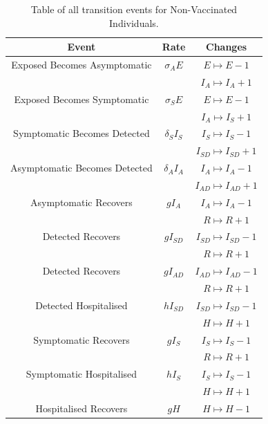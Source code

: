 \documentclass[a4paper,11pt]{article}
\theoremstyle{plain}
\theoremstyle{definition}
\begin{document}
\begin{table}[hbtp]
		\begin{center}
		    \caption{Table of all transition events for Non-Vaccinated Individuals.}
			\begin{tabular}{ c|c|c }
				Event & Rate & Changes \\ 
	        	\hline
		        \hline
	            Exposed Becomes Asymptomatic & $\sigma_AE$ & $E \mapsto E - 1$  \\
	            & & $I_A \mapsto I_A + 1$\\
	            \hline
	            Exposed Becomes Symptomatic & $\sigma_SE$ &  $E \mapsto E - 1$ \\
	            &  & $I_A \mapsto I_S + 1$\\
	            \hline
	            Symptomatic Becomes Detected & $\delta_SI_S$ & $I_S \mapsto I_S - 1$  \\
	            & & $I_{SD} \mapsto I_{SD} + 1$\\
	            \hline
	            Asymptomatic Becomes Detected & $\delta_A I_A$ & $I_A \mapsto I_A - 1$  \\
	            &  & $I_{AD} \mapsto I_{AD} + 1$\\
	            \hline
		        Asymptomatic Recovers & $g I_A$ & $I_A \mapsto I_A - 1$  \\
	            &  & $R \mapsto R + 1$\\
	            \hline
	            Detected Recovers & $g I_{SD}$ & $I_{SD} \mapsto I_{SD} - 1$ \\
	             &  & $R \mapsto R + 1$\\
	            \hline
	            Detected Recovers & $g I_{AD}$ & $I_{AD} \mapsto I_{AD} - 1$ \\
	             &  & $R \mapsto R + 1$\\
	            \hline
	            Detected Hospitalised & $h I_{SD}$ & $I_{SD} \mapsto I_{SD} - 1$ \\
	             &  & $H \mapsto H + 1$\\
	            \hline
	            Symptomatic Recovers & $g I_S$ & $I_S \mapsto I_S - 1$ \\
	            &  & $R \mapsto R + 1$\\
	            \hline
	            Symptomatic Hospitalised & $h I_S$ &  $I_S \mapsto I_S - 1$\\
	            &  & $H \mapsto H + 1$\\
	            \hline
	            Hospitalised Recovers & $g H$ & $H \mapsto H - 1$\\

\end{tabular}
\end{center}
\end{table}
\end{document}
